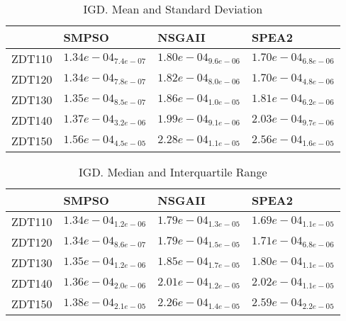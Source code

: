 \documentclass{article}
\begin{document}
\begin{table}
\caption{IGD. Mean and Standard Deviation}
\label{table: IGD}
\centering
\begin{scriptsize}
\begin{tabular}{llll}
\hline & SMPSO & NSGAII &  SPEA2\\
\hline 
ZDT110 & \cellcolor{gray95}$  1.34e-04_{ 7.4e-07}$ & $  1.80e-04_{ 9.6e-06}$ & \cellcolor{gray25}$  1.70e-04_{ 6.8e-06}$ \\
ZDT120 & \cellcolor{gray95}$  1.34e-04_{ 7.8e-07}$ & $  1.82e-04_{ 8.0e-06}$ & \cellcolor{gray25}$  1.70e-04_{ 4.8e-06}$ \\
ZDT130 & \cellcolor{gray95}$  1.35e-04_{ 8.5e-07}$ & $  1.86e-04_{ 1.0e-05}$ & \cellcolor{gray25}$  1.81e-04_{ 6.2e-06}$ \\
ZDT140 & \cellcolor{gray95}$  1.37e-04_{ 3.2e-06}$ & \cellcolor{gray25}$  1.99e-04_{ 9.1e-06}$ & $  2.03e-04_{ 9.7e-06}$ \\
ZDT150 & \cellcolor{gray95}$  1.56e-04_{ 4.5e-05}$ & \cellcolor{gray25}$  2.28e-04_{ 1.1e-05}$ & $  2.56e-04_{ 1.6e-05}$ \\
\hline
\end{tabular}
\end{scriptsize}
\end{table}

\begin{table}
\caption{IGD. Median and Interquartile Range}
\label{table: IGD}
\centering
\begin{scriptsize}
\begin{tabular}{llll}
\hline & SMPSO & NSGAII &  SPEA2\\
\hline 
ZDT110 & \cellcolor{gray95}$  1.34e-04_{ 1.2e-06}$ & $  1.79e-04_{ 1.3e-05}$ & \cellcolor{gray25}$  1.69e-04_{ 1.1e-05}$ \\
ZDT120 & \cellcolor{gray95}$  1.34e-04_{ 8.6e-07}$ & $  1.79e-04_{ 1.5e-05}$ & \cellcolor{gray25}$  1.71e-04_{ 6.8e-06}$ \\
ZDT130 & \cellcolor{gray95}$  1.35e-04_{ 1.2e-06}$ & $  1.85e-04_{ 1.7e-05}$ & \cellcolor{gray25}$  1.80e-04_{ 1.1e-05}$ \\
ZDT140 & \cellcolor{gray95}$  1.36e-04_{ 2.0e-06}$ & \cellcolor{gray25}$  2.01e-04_{ 1.2e-05}$ & $  2.02e-04_{ 1.1e-05}$ \\
ZDT150 & \cellcolor{gray95}$  1.38e-04_{ 2.1e-05}$ & \cellcolor{gray25}$  2.26e-04_{ 1.4e-05}$ & $  2.59e-04_{ 2.2e-05}$ \\
\hline
\end{tabular}
\end{scriptsize}
\end{table}
\end{document}
